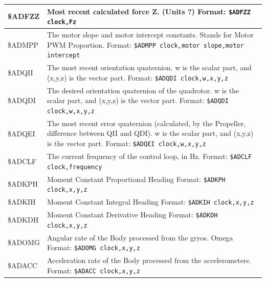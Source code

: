 \documentclass{article}
\numberwithin{equation}{section} %
\begin{document}
\begin{longtable}{p{2cm}p{9cm}}
\hline
\$ADFZZ &
Most recent calculated force Z. (Units ?)
\newline
Format:\newline
\texttt{\$ADFZZ clock,Fz} \\
\hline
\$ADMPP &
The motor slope and motor intercept constants. Stands for Motor PWM Proportion.
\newline
Format:\newline
\texttt{\$ADMPP clock,motor slope,motor intercept} \\
\hline
\$ADQII &
The most recent orientation quaternion.
w is the scalar part, and (x,y,z) is the vector part.
\newline
Format:\newline
\texttt{\$ADQDI clock,w,x,y,z} \\
\hline
\$ADQDI &
The desired orientation quaternion of the quadrotor.
w is the scalar part, and (x,y,z) is the vector part.
\newline
Format:\newline
\texttt{\$ADQDI clock,w,x,y,z} \\
\hline
\$ADQEI &
The most recent error quaternion (calculated, by the Propeller, difference between QII and QDI).
w is the scalar part, and (x,y,z) is the vector part.
\newline
Format:\newline
\texttt{\$ADQEI clock,w,x,y,z} \\
\hline
\$ADCLF &
The current frequency of the control loop, in Hz.
\newline
Format:\newline
\texttt{\$ADCLF clock,frequency} \\
\hline
\$ADKPH &
Moment Constant Proportional Heading
\newline
Format:\newline
\texttt{\$ADKPH clock,x,y,z} \\
\hline
\$ADKIH &
Moment Constant Integral Heading
\newline
Format:\newline
\texttt{\$ADKIH clock,x,y,z} \\
\hline
\$ADKDH &
Moment Constant Derivative Heading
\newline
Format:\newline
\texttt{\$ADKDH clock,x,y,z} \\
\hline
\$ADOMG &
Angular rate of the Body processed from the gryos. Omega
\newline
Format:\newline
\texttt{\$ADOMG clock,x,y,z} \\
\hline
\$ADACC &
Acceleration rate of the Body processed from the accelerometers.
\newline
Format:\newline
\texttt{\$ADACC clock,x,y,z} \\
\end{longtable}
\end{document}
